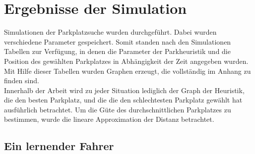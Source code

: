 \section{Ergebnisse der Simulation}

Simulationen der Parkplatzsuche wurden durchgeführt. Dabei wurden verschiedene Parameter gespeichert. Somit standen nach den Simulationen Tabellen zur Verfügung, in denen die Parameter der Parkheuristik und die Position des gewählten Parkplatzes in Abhängigkeit der Zeit angegeben wurden. \\
Mit Hilfe dieser Tabellen wurden Graphen erzeugt, die vollständig im Anhang zu finden sind.\\
Innerhalb der Arbeit wird zu jeder Situation lediglich der Graph der Heuristik, die den besten Parkplatz, und die die den schlechtesten Parkplatz gewählt hat ausführlich betrachtet. Um die Güte des durchschnittlichen Parkplatzes zu bestimmen, wurde die lineare Approximation der Distanz betrachtet. \\
\subsection{Ein lernender Fahrer}
